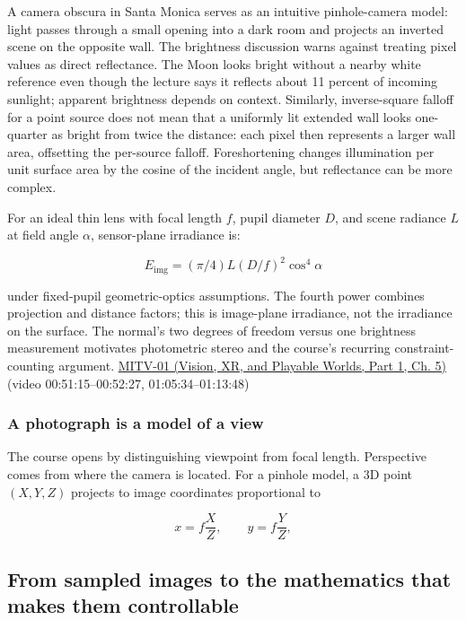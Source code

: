 A camera obscura in Santa Monica serves as an intuitive pinhole-camera model: light passes through a small opening into a dark room and projects an inverted scene on the opposite wall. The brightness discussion warns against treating pixel values as direct reflectance. The Moon looks bright without a nearby white reference even though the lecture says it reflects about 11 percent of incoming sunlight; apparent brightness depends on context. Similarly, inverse-square falloff for a point source does not mean that a uniformly lit extended wall looks one-quarter as bright from twice the distance: each pixel then represents a larger wall area, offsetting the per-source falloff. Foreshortening changes illumination per unit surface area by the cosine of the incident angle, but reflectance can be more complex.

For an ideal thin lens with focal length \(f\), pupil diameter \(D\), and scene radiance \(L\) at field angle \(\alpha\), sensor-plane irradiance is:

\[E_{\mathrm{img}}=(\pi/4)L(D/f)^2\cos^4\alpha\]

under fixed-pupil geometric-optics assumptions. The fourth power combines projection and distance factors; this is image-plane irradiance, not the irradiance on the surface. The normal's two degrees of freedom versus one brightness measurement motivates photometric stereo and the course's recurring constraint-counting argument. \href{../07-Vision-XR-and-Playable-Worlds-P01/main.pdf\#04-visual-computing-ii-ch036-mitv-01---introduction-to-machine-vision}{MITV-01 (Vision, XR, and Playable Worlds, Part 1, Ch. 5)} (video 00:51:15--00:52:27, 01:05:34--01:13:48)

\subsubsection{A photograph is a model of a view}\label{03-visual-computing-i-ch001-a-photograph-is-a-model-of-a-view}

\hypertarget{03-visual-computing-i-ch001-a-photograph-is-a-model-of-a-view}{}

The course opens by distinguishing viewpoint from focal length. Perspective comes from where the camera is located. For a pinhole model, a 3D point \((X,Y,Z)\) projects to image coordinates proportional to

\[
x=f\frac{X}{Z},\qquad y=f\frac{Y}{Z},
\]

\subsection{From sampled images to the mathematics that makes them controllable}\label{03-visual-computing-i-ch001-from-sampled-images-to-the-mathematics-that-makes-them-controllable}

